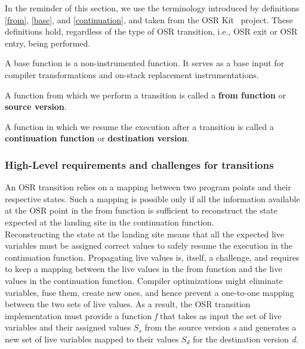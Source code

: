 In the reminder of this section, we use the terminology introduced by definitions \ref{from}, \ref{base}, and \ref{continuation}, and taken from the OSR Kit~\cite{OSRKit} project.
These definitions hold, regardless of the type of OSR transition, i.e., OSR exit or OSR entry, being performed.\\

\begin{definition}\label{base}
A base function is a non-instrumented function. 
It serves as a base input for compiler transformations and on-stack replacement instrumentations.
\end{definition}

\begin{definition}\label{from}
A function from which we perform a transition is called a \textbf{from function} or \textbf{source version}.
\end{definition}

\begin{definition}\label{continuation}
A function in which we resume the execution after a transition is called a \textbf{continuation function} or \textbf{destination version}.
\end{definition}

\subsubsection{High-Level requirements and challenges for transitions}\label{HLREQ}

An OSR transition relies on a mapping between two program points and their respective states.
Such a mapping is possible only if all the information available at the OSR point in the from function is sufficient to reconstruct the state expected at the landing site in the continuation function.\\

Reconstructing the state at the landing site means that all the expected live variables must be assigned  correct values to safely resume the execution in the continuation function.
Propagating live values is, itself, a challenge, and requires to keep a mapping between the live values in the from function and the live values in the continuation function.
Compiler optimizations might eliminate variables, fuse them, create new ones, and hence prevent a one-to-one mapping between the two sets of live values. 
As a result, the OSR transition implementation must provide a function \textit{f} that takes as input the set of live variables and their assigned values $S_s$ from the source version \textit{s} and generates a new set of live variables mapped to their values $S_d$ for the destination version \textit{d}.

